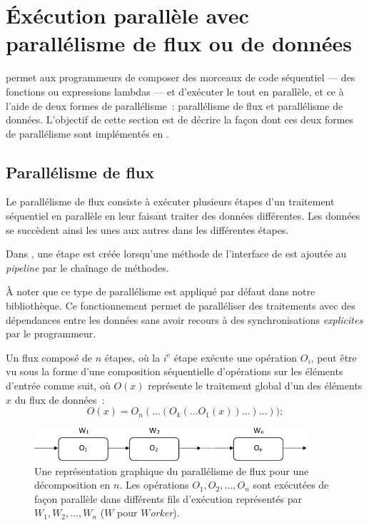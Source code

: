 \section{\'Ex\'ecution parall\`ele avec parall\'elisme de flux ou de donn\'ees}

 permet aux programmeurs de composer des morceaux de code s\'equentiel --- des fonctions ou expressions lambdas --- et d'ex\'ecuter le tout en parall\`ele, et ce à l'aide de deux formes de parallélisme~:
parall\'elisme de flux et parall\'elisme de donn\'ees.
%
L'objectif de cette section est de d\'ecrire la façon dont ces deux formes de parall\'elisme sont impl\'ement\'es en . 

\subsection{Parall\'elisme de flux}
\label{ParallelismeDuFlux.sect}

Le parall\'elisme de flux consiste \`a ex\'ecuter plusieurs \'etapes d'un traitement s\'equentiel en parall\`ele en leur faisant traiter des donn\'ees diff\'erentes. Les donn\'ees se succ\`edent ainsi les unes aux autres dans les diff\'erentes \'etapes.

Dans , une {\'etape} est cr\'e\'ee lorsqu'une m\'ethode de l'interface de  est ajout\'ee au \emph{pipeline} par le cha\^inage de m\'ethodes.

\`A noter que ce type de parall\'elisme est appliqu\'e par d\'efaut dans notre biblioth\`eque. 
%
Ce fonctionnement permet de parall\'eliser des traitements avec des d\'ependances entre les donn\'ees sans avoir recours \`a des synchronisations \emph{explicites} par le programmeur. 

\goodbreak
\begin{samepage}
Un flux compos\'e de $n$ {étapes}, o\`u la $i^{\grave e}$ étape ex\'ecute une op\'eration $O_i$, peut \^etre vu sous la forme d'une composition s\'equentielle d'op\'erations sur les \'el\'ements d'entr\'ee comme suit, o\`u $O(x)$ repr\'esente le traitement global d'un des \'el\'ements $x$ du flux de données~: 
%
\[
	O(x) = O_n( \ldots (O_k( \ldots O_1(x)) \ldots ) \ldots ));
\]
\end{samepage}


\begin{figure}

\centering
     \includegraphics[width=0.9\textwidth]{Figures/ParallelismeDuFlux.png}
      \caption[Une repr\'esentation graphique du parall\'elisme de flux en \ppff.]{Une repr\'esentation graphique du parall\'elisme de flux pour une d\'ecomposition en $n$. Les op\'erations $O_1, O_2, \ldots, O_n$ sont ex\'ecut\'ees de fa\c{c}on parall\`ele dans diff\'erents fils d'ex\'ecution représentés par $W_1, W_2, \ldots, W_n$ ($W$ pour \emph{$W$orker}).}
       \label{ParallelismeDuFlux.fig}
\end{figure}


